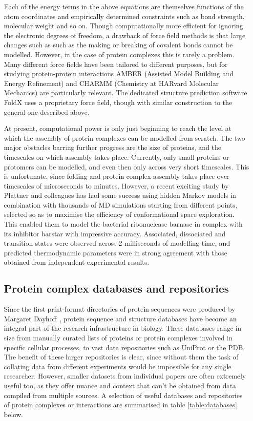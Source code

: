 \documentclass[a4paper,11pt,twoside,openright]{scrbook}
\begin{document}
Each of the energy terms in the above equations are themselves functions of the atom coordinates and empirically determined constraints such as bond strength, molecular weight and so on. Though computationally more efficient for ignoring the electronic degrees of freedom, a drawback of force field methods is that large changes such as such as the making or breaking of covalent bonds cannot be modelled. However, in the case of protein complexes this is rarely a problem. Many different force fields have been tailored to different purposes, but for studying protein-protein interactions AMBER \cite{Salomon-Ferrer2013,Amber2017} (Assisted Model Building and Energy Refinement) and CHARMM \cite{Brooks2009} (Chemistry at HARvard Molecular Mechanics) are particularly relevant. The dedicated structure prediction software FoldX \cite{Schymkowitz2005} uses a proprietary force field, though with similar construction to the general one described above.

At present, computational power is only just beginning to reach the level at which the assembly of protein complexes can be modelled from scratch. The two major obstacles barring further progress are the size of proteins, and the timescales on which assembly takes place. Currently, only small proteins or protomers can be modelled, and even then only across very short timescales. This is unfortunate, since folding and protein complex assembly takes place over timescales of microseconds to minutes. However, a recent exciting study by Plattner and colleagues \cite{Plattner2017} has had some success using hidden Markov models in combination with thousands of MD simulations starting from different points, selected so as to maximise the efficiency of conformational space exploration. This enabled them to model the bacterial ribonuclease barnase in complex with its inhibitor barstar with impressive accuracy. Associated, dissociated and transition states were observed across 2 milliseconds of modelling time, and predicted thermodynamic parameters were in strong agreement with those obtained from independent experimental results.

\subsection{Protein complex databases and repositories}
Since the first print-format directories of protein sequences were produced by Margaret Dayhoff \cite{Dayhoff1965}, protein sequence and structure databases have become an integral part of the research infrastructure in biology. These databases range in size from manually curated lists of proteins or protein complexes involved in specific cellular processes, to vast data repositories such as UniProt or the PDB. The benefit of these larger repositories is clear, since without them the task of collating data from different experiments would be impossible for any single researcher. However, smaller datasets from individual papers are often extremely useful too, as they offer nuance and context that can't be obtained from data compiled from multiple sources. A selection of useful databases and repositories of protein complexes or interactions are summarised in table \ref{table:databases} below.
\end{document}
